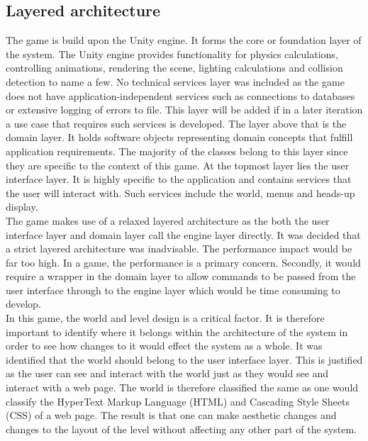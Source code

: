 \documentclass[11pt,a4paper]{article}
\begin{document}
\subsection{Layered architecture}
The game is build upon the Unity engine. It forms the core or foundation layer of the system. The Unity engine provides functionality for physics calculations, controlling animations, rendering the scene, lighting calculations and collision detection to name a few. No technical services layer was included as the game does not have application-independent services such as connections to databases or extensive logging of errors to file. This layer will be added if in a later iteration a use case that requires such services is developed. The layer above that is the domain layer. It holds software objects representing domain concepts that fulfill application requirements. The majority of the classes belong to this layer since they are specific to the context of this game. At the topmost layer lies the user interface layer. It is highly specific to the application and contains services that the user will interact with. Such services include the world, menus and heads-up display.\smallskip\\
The game makes use of a relaxed layered architecture as the both the user interface layer and domain layer call the engine layer directly. It was decided that a strict layered architecture was inadvisable. The performance impact would be far too high. In a game, the performance is a primary concern. Secondly, it would require a wrapper in the domain layer to allow commands to be passed from the user interface through to the engine layer which would be time consuming to develop. \smallskip\\
In this game, the world and level design is a critical factor. It is therefore important to identify where it belongs within the architecture of the system in order to see how changes to it would effect the system as a whole. It was identified that the world should belong to the user interface layer. This is justified as the user can see and interact with the world just as they would see and interact with a web page. The world is therefore classified the same as one would classify the HyperText Markup Language (HTML) and Cascading Style Sheets (CSS) of a web page. The result is that one can make aesthetic changes and changes to the layout of the level without affecting any other part of the system.
\end{document}
